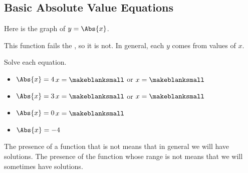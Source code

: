 \subsection{Basic Absolute Value Equations} 
Here is the graph of $y=\Abs{x}$.
\begin{center}
\end{center}
This function fails the \makeblank[3in], so it is not\linebreak\makeblank. In general, each $y$ comes from \makeblanksmall values of $x$.
\begin{Example}Solve each equation.
\begin{itemize}
\item $\Abs{x}=4$\hfill$x=\makeblanksmall$ or $x=\makeblanksmall$
\item $\Abs{x}=3$\hfill$x=\makeblanksmall$ or $x=\makeblanksmall$
\item $\Abs{x}=0$\hfill$x=\makeblanksmall$
\item $\Abs{x}=-4$\hfill\makeblank
\end{itemize}
\end{Example}
\begin{Note}The presence of a function that is not \makeblank[1in] means that in general we will have \makeblanksmall solutions. The presence of the function whose range is not \makeblank means that we will sometimes have \makeblanksmall solutions.\end{Note}